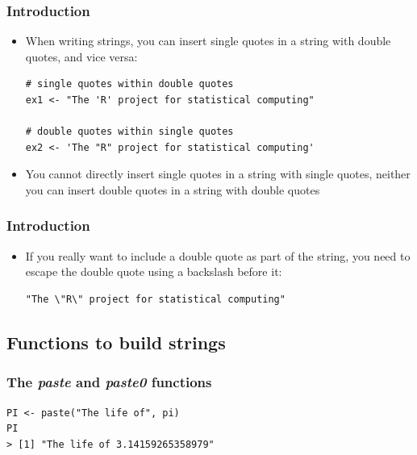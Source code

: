 \documentclass[xcolor=dvipsnames, xcolor=table]{beamer} %
\theoremstyle{mystyle}
\begin{document}
\begin{frame}[fragile] %
\frametitle{Introduction}

\begin{itemize}

\item When writing strings, you can insert single quotes in a string with double quotes, and vice versa:

\begin{verbatim}
# single quotes within double quotes
ex1 <- "The 'R' project for statistical computing"

# double quotes within single quotes
ex2 <- 'The "R" project for statistical computing'
\end{verbatim}

\item You cannot directly insert single quotes in a string with single quotes, neither you can insert double quotes in a string with double quotes

\end{itemize}
\end{frame}

\begin{frame}[fragile] %
\frametitle{Introduction}

\begin{itemize}

\item If you really want to include a double quote as part of the string, you need to escape the double quote using a backslash before it:

\begin{verbatim}
"The \"R\" project for statistical computing"
\end{verbatim}

\end{itemize}
\end{frame}

\subsection{Functions to build strings}

\begin{frame}[fragile]
\frametitle{The \textit{paste} and \textit{paste0} functions}

\begin{verbatim}
PI <- paste("The life of", pi)
PI
> [1] "The life of 3.14159265358979"
\end{verbatim}

\end{frame}
\end{document}
